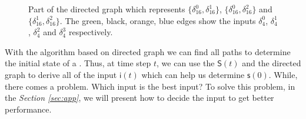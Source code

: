 \begin{figure}[thpb]
      \centering
      
      \caption{Part of the directed graph which represents $\{\delta_{16}^0,\delta_{16}^1\}$, $\{\delta_{16}^0,\delta_{16}^2\}$ and $\{\delta_{16}^1,\delta_{16}^2\}$. The green, black, orange, blue edges show the inputs $\delta_4^0$, $\delta_4^1$, $\delta_4^2$ and $\delta_4^3$ respectively.}
      \label{fig:4}
   \end{figure}

With the algorithm based on directed graph we can find all paths to determine the initial state of a \BCN. Thus, at time step $t$, we can use the $\mathsf{S}(t)$ and the directed graph to derive all of the input $\mathsf{i}(t)$ which can help us determine $\mathsf{s}(0)$. While, there comes a problem. Which input is the best input? To solve this problem, in the {\em Section \ref{sec:app}}, we will present how to decide the input to get better performance.
